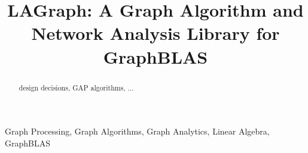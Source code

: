 \documentclass[conference]{IEEEtran}
\begin{document}
\title{LAGraph: A Graph Algorithm and Network Analysis Library for GraphBLAS}

\author{
}

\maketitle

\begin{abstract}
design decisions, GAP algorithms, ...
\end{abstract}

\begin{IEEEkeywords}
Graph Processing, Graph Algorithms, Graph Analytics, Linear Algebra, GraphBLAS
\end{IEEEkeywords}
















\clearpage


\end{document}
